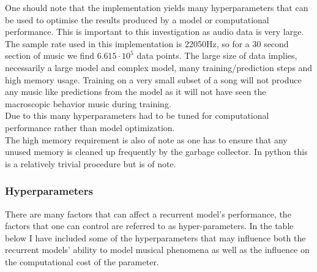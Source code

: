 \documentclass{article}
\begin{document}
One should note that the implementation yields many hyperparameters that can be used to optimise the results produced by a model or computational performance. This is important to this investigation as audio data is very large. The sample rate used in this implementation is 22050Hz, so for a 30 second section of music we find $6.615\cdot 10^{5}$ data points. The large size of data implies, necessarily a large model and complex model, many training/prediction steps and high memory usage. Training on a very small subset of a song will not produce any music like predictions from the model as it will not have seen the macroscopic behavior music during training. \\
Due to this many hyperparameters had to be tuned for computational performance rather than model optimization. \\
The high memory requirement is also of note as one has to ensure that any unused memory is cleaned up frequently by the garbage collector. In python this is a relatively trivial procedure but is of note. 

\subsubsection{Hyperparameters}
There are many factors that can affect a recurrent model's performance, the factors that one can control are referred to as hyper-parameters. In the table below I have included some of the hyperparameters that may influence both the recurrent models' ability to model musical phenomena as well as the influence on the computational cost of the parameter.
\end{document}
